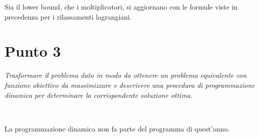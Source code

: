 \documentclass[11pt]{book}
\begin{document}
Sia il lower bound, che i moltiplicatori, si aggiornano con le formule
viste in precedenza per i rilassamenti lagrangiani.

\section*{Punto 3}

\textit{Trasformare il problema dato in modo da ottenere un problema
equivalente con funzione obiettivo da massimizzare e descrivere una
procedura di programmazione dinamica per determinare la corrispondente
soluzione ottima.}

\

La programmazione dinamica non fa parte del programma di quest'anno.
\end{document}
